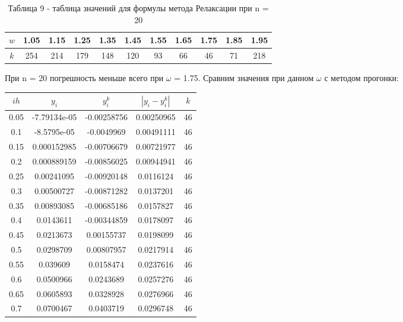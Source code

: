 \documentclass[a4paper,12pt]{article}
\begin{document}
\begin{enumerate}[label = \arabic*.]
{\begin{table}[h]
      \centering
      \begin{tabular}{|c|c|c|c|c|c|c|c|c|c|c|}
        \hline
        $w$ & 1.05 & 1.15 & 1.25 & 1.35 & 1.45 & 1.55 & 1.65 & 1.75 & 1.85 & 1.95 \\ \hline
        $k$ & 254 & 214 & 179 & 148 & 120 & 93 & 66 & 46 & 71 & 218 \\ \hline
      \end{tabular}
      \caption*{\small{Таблица 9 - таблица значений для формулы метода Релаксации при n = 20}}
    \end{table}
  \newpage
  \hspace{0.5cm} При n = 20 погрешность меньше всего при $\omega$ = 1.75. 
  Сравним значения при данном $\omega$ с методом прогонки:
      \begin{table}[h]
        \centering
        \begin{tabular}{|c|c|c|c|c|}
          \hline
          $ih$ & $y_i$ & $y^k_i$ & $\left|y_i-y^k_i\right|$ & $k$\\ \hline
          0.05 & -7.79134e-05 &  -0.00258756 &   0.00250965 & 46\\ \hline
          0.1 &  -8.5795e-05 &   -0.0049969 &   0.00491111 & 46\\ \hline
          0.15 &  0.000152985 &  -0.00706679 &   0.00721977 & 46\\ \hline
          0.2 &  0.000889159 &  -0.00856025 &   0.00944941 & 46\\ \hline
          0.25 &   0.00241095 &  -0.00920148 &    0.0116124 & 46\\ \hline
          0.3 &   0.00500727 &  -0.00871282 &    0.0137201 & 46\\ \hline
          0.35 &   0.00893085 &  -0.00685186 &    0.0157827 & 46\\ \hline
          0.4 &    0.0143611 &  -0.00344859 &    0.0178097 & 46\\ \hline
          0.45 &    0.0213673 &   0.00155737 &    0.0198099 & 46\\ \hline
          0.5 &    0.0298709 &   0.00807957 &    0.0217914 & 46\\ \hline
          0.55 &     0.039609 &    0.0158474 &    0.0237616 & 46\\ \hline
          0.6 &    0.0500966 &    0.0243689 &    0.0257276 & 46\\ \hline
          0.65 &    0.0605893 &    0.0328928 &    0.0276966 & 46\\ \hline
          0.7 &    0.0700467 &    0.0403719 &    0.0296748 & 46\\ \hline

\end{tabular}
\end{table}}
\end{enumerate}
\end{document}
